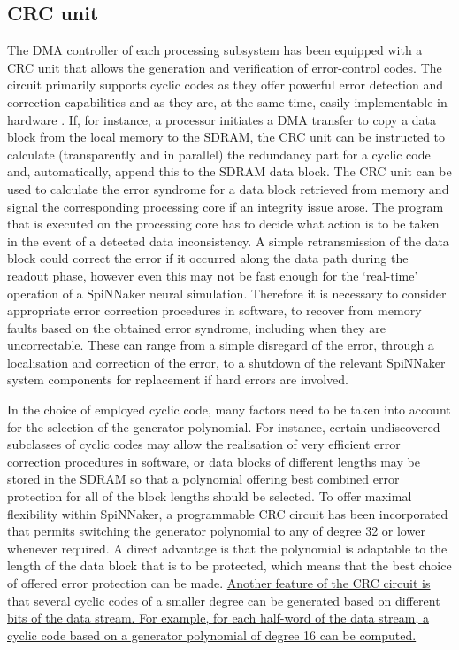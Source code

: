 \documentclass[a4paper, 11pt]{article}
\begin{document}
\subsection{CRC unit}
The DMA controller of each processing subsystem has been equipped with a CRC unit that allows the generation and verification of error-control codes. The circuit primarily supports cyclic codes as they offer powerful error detection and correction capabilities and as they are, at the same time, easily implementable in hardware \citep{costello2004error}. If, for instance, a processor initiates a DMA transfer to copy a data block from the local memory to the SDRAM, the CRC unit can be instructed to calculate (transparently and in parallel) the redundancy part for a cyclic code and, automatically, append this to the SDRAM data block. The CRC unit can be used to calculate the error syndrome for a data block retrieved from memory and signal the corresponding processing core if an integrity issue arose. The program that is executed on the processing core has to decide what action is to be taken in the event of a detected data inconsistency. A simple retransmission of the data block could correct the error if it occurred along the data path during the readout phase, however even this may not be fast enough for the `real-time' operation of a SpiNNaker neural simulation. Therefore it is necessary to consider appropriate error correction procedures in software, to recover from memory faults based on the obtained error syndrome, including when they are uncorrectable. These can range from a simple disregard of the error, through a localisation and correction of the error, to a shutdown of the relevant SpiNNaker system components for replacement if hard errors are involved.

In the choice of employed cyclic code, many factors need to be taken into account for the selection of the generator polynomial. For instance, certain undiscovered subclasses of cyclic codes may allow the realisation of very efficient error correction procedures in software, or data blocks of different lengths may be stored in the SDRAM so that a polynomial offering best combined error protection for all of the block lengths should be selected. To offer maximal flexibility within SpiNNaker, a programmable CRC circuit has been incorporated that permits switching the generator polynomial to any of degree 32 or lower whenever required. A direct advantage is that the polynomial is adaptable to the length of the data block that is to be protected, which means that the best choice of offered error protection can be made. \ul{Another feature of the CRC circuit is that several cyclic codes of a smaller degree can be generated based on different bits of the data stream. For example, for each half-word of the data stream, a cyclic code based on a generator polynomial of degree 16 can be computed.}
\end{document}
